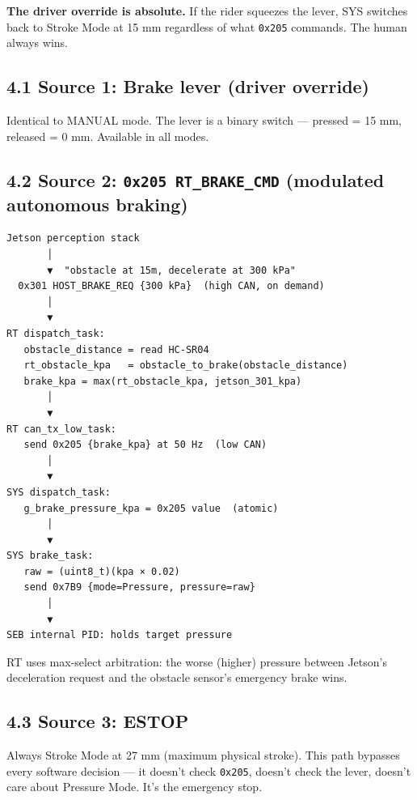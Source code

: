 \documentclass[12pt,a4paper,oneside]{report}
\begin{document}
\textbf{The driver override is absolute.} If the rider squeezes the lever, SYS
switches back to Stroke Mode at 15 mm regardless of what \texttt{0x205}
commands. The human always wins.

\subsection{4.1 Source 1: Brake lever (driver
override)}\label{source-1-brake-lever-driver-override}

Identical to MANUAL mode. The lever is a binary switch --- pressed = 15 mm,
released = 0 mm. Available in all modes.

\subsection{\texorpdfstring{4.2 Source 2: \texttt{0x205\ RT\_BRAKE\_CMD}
(modulated autonomous
braking)}{4.2 Source 2: 0x205 RT\_BRAKE\_CMD (modulated autonomous braking)}}\label{source-2-0x205-rt_brake_cmd-modulated-autonomous-braking}

\begin{verbatim}
Jetson perception stack
       │
       ▼  "obstacle at 15m, decelerate at 300 kPa"
  0x301 HOST_BRAKE_REQ {300 kPa}  (high CAN, on demand)
       │
       ▼
RT dispatch_task:
   obstacle_distance = read HC-SR04
   rt_obstacle_kpa   = obstacle_to_brake(obstacle_distance)
   brake_kpa = max(rt_obstacle_kpa, jetson_301_kpa)
       │
       ▼
RT can_tx_low_task:
   send 0x205 {brake_kpa} at 50 Hz  (low CAN)
       │
       ▼
SYS dispatch_task:
   g_brake_pressure_kpa = 0x205 value  (atomic)
       │
       ▼
SYS brake_task:
   raw = (uint8_t)(kpa × 0.02)
   send 0x7B9 {mode=Pressure, pressure=raw}
       │
       ▼
SEB internal PID: holds target pressure
\end{verbatim}

RT uses max-select arbitration: the worse (higher) pressure between Jetson's
deceleration request and the obstacle sensor's emergency brake wins.

\subsection{4.3 Source 3: ESTOP}\label{source-3-estop}

Always Stroke Mode at 27 mm (maximum physical stroke). This path bypasses every
software decision --- it doesn't check \texttt{0x205}, doesn't check the lever,
doesn't care about Pressure Mode. It's the emergency stop.
\end{document}
